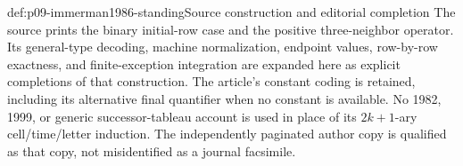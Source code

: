 \begin{proofboundary}{def:p09-immerman1986-standing}{Source construction and editorial completion}
The source prints the binary initial-row case and the positive
three-neighbor operator.  Its general-type decoding, machine normalization,
endpoint values, row-by-row exactness, and finite-exception integration are
expanded here as explicit completions of that construction.  The
article's constant coding is retained, including its alternative final
quantifier when no constant is available.  No 1982, 1999, or generic
successor-tableau account is used in place of its \(2k+1\)-ary
cell/time/letter induction.  The independently paginated author copy is
qualified as that copy, not misidentified as a journal facsimile.
\end{proofboundary}
